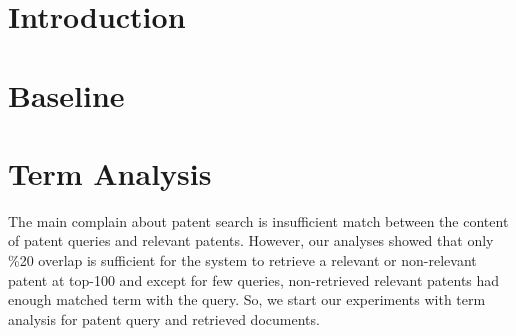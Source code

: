 \documentclass{sig-alternate}
\begin{document}
\date{30 July 1999}

\maketitle
\begin{abstract}

\end{abstract}




\section{Introduction}

\section{Baseline}

\section{Term Analysis}
The main complain about patent search is insufficient match between the content of patent queries and relevant
patents\cite{magdy2012toward, mahdabi2013leveraging}. However, our analyses showed that only \%20 overlap is sufficient for the system to retrieve a relevant or non-relevant patent at top-100 and except for few queries, non-retrieved relevant patents had enough matched term with the query. So, we start our experiments with term analysis for patent query and retrieved documents. 
\end{document}

